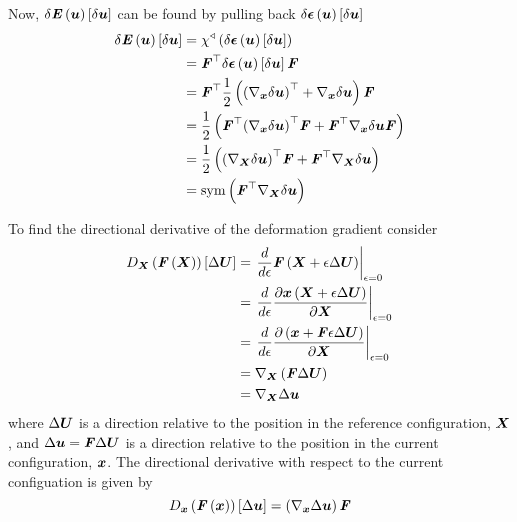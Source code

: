 Now, $   \delta   \boldsymbol{\mathit{E}}\left(  \boldsymbol{u}  \right) \left[   \delta   \boldsymbol{u}   \right]  $ can be found by pulling
back $   \delta   \boldsymbol{\mathit{\epsilon}}\left(  \boldsymbol{u}  \right) \left[   \delta   \boldsymbol{u}   \right]  $ \ie
\begin{equation}
  \begin{split}
    \variation{\fnof{\tensortwo{E}}{\vectr{u}}}{\vectr{u}}&=\pullback{\chi}{\pbrac{\variation{\fnof{\tensortwo{\epsilon}}{\vectr{u}}}{\vectr{u}}}}\\
    &=\transpose{\tensortwo{F}}\variation{\fnof{\tensortwo{\epsilon}}{\vectr{u}}}{\vectr{u}}\tensortwo{F}\\
    &=\transpose{\tensortwo{F}}\frac{1}{2}\pbrac{\transpose{\pbrac{\gradient{\vectr{x}}{\variationdir{\vectr{u}}}}}
      +\gradient{\vectr{x}}{\variationdir{\vectr{u}}}}\tensortwo{F}\\
    &=\frac{1}{2}\pbrac{\transpose{\tensortwo{F}}\transpose{\pbrac{\gradient{\vectr{x}}{\variationdir{\vectr{u}}}}}\tensortwo{F}+
      \transpose{\tensortwo{F}}\gradient{\vectr{x}}{\variationdir{\vectr{u}}}\tensortwo{F}}\\
    &=\frac{1}{2}\pbrac{\transpose{\pbrac{\gradient{\vectr{X}}{\variationdir{\vectr{u}}}}}\tensortwo{F}+
      \transpose{\tensortwo{F}}\gradient{\vectr{X}}{\variationdir{\vectr{u}}}} \\
    &= \symop\pbrac{\transpose{\tensortwo{F}}\gradient{\vectr{X}}{\variationdir{\vectr{u}}}}
  \end{split}
\end{equation}

To find the directional derivative of the deformation gradient consider
\begin{equation}
  \begin{split}
    \directionalderiv{\vectr{X}}{\fnof{\tensor{F}}{\vectr{X}}}{\linearisationdir{\vectr{U}}}&=\evalat{\dby{}{\epsilon}\fnof{\tensor{F}}{\vectr{X}+\epsilon\linearisationdir{\vectr{U}}}}{\epsilon=0}\\    
    &=\evalat{\dby{}{\epsilon}\delby{\fnof{\vectr{x}}{\vectr{X}+\epsilon\linearisationdir{\vectr{U}}}}{\vectr{X}}}{\epsilon=0}\\
    &=\evalat{\dby{}{\epsilon}\delby{\pbrac{\vectr{x}+\tensor{F}\epsilon\linearisationdir{\vectr{U}}}}{\vectr{X}}}{\epsilon=0}\\
    &=\gradient{\vectr{X}}{\pbrac{\tensor{F}\linearisationdir{\vectr{U}}}}\\
    &=\gradient{\vectr{X}}{\linearisationdir{\vectr{u}}}
  \end{split}
\end{equation}
where $  \Delta   \boldsymbol{U}  $ is a direction relative to the position in the
reference configuration, $ \boldsymbol{X} $, and $  \Delta   \boldsymbol{u}  =\boldsymbol{\mathit{F}}  \Delta   \boldsymbol{U}  $ is a direction
relative to the position in the current configuration, $ \boldsymbol{x} $. The
directional derivative with respect to the current configuation is given by
\begin{equation}
  \directionalderiv{\vectr{x}}{\fnof{\tensor{F}}{\vectr{x}}}{\linearisationdir{\vectr{u}}}=\pbrac{\gradient{\vectr{x}}{\linearisationdir{\vectr{u}}}}\tensor{F}
\end{equation}

